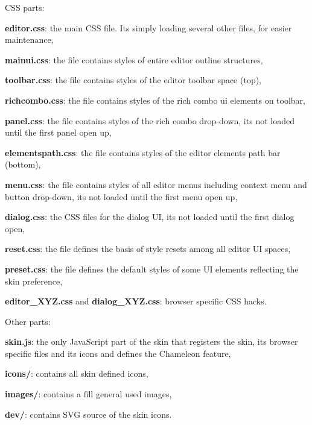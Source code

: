 C\+S\+S parts\+:
\begin{DoxyItemize}
\item {\bfseries editor.\+css}\+: the main C\+S\+S file. It\textquotesingle{}s simply loading several other files, for easier maintenance,
\item {\bfseries mainui.\+css}\+: the file contains styles of entire editor outline structures,
\item {\bfseries toolbar.\+css}\+: the file contains styles of the editor toolbar space (top),
\item {\bfseries richcombo.\+css}\+: the file contains styles of the rich combo ui elements on toolbar,
\item {\bfseries panel.\+css}\+: the file contains styles of the rich combo drop-\/down, it\textquotesingle{}s not loaded until the first panel open up,
\item {\bfseries elementspath.\+css}\+: the file contains styles of the editor elements path bar (bottom),
\item {\bfseries menu.\+css}\+: the file contains styles of all editor menus including context menu and button drop-\/down, it\textquotesingle{}s not loaded until the first menu open up,
\item {\bfseries dialog.\+css}\+: the C\+S\+S files for the dialog U\+I, it\textquotesingle{}s not loaded until the first dialog open,
\item {\bfseries reset.\+css}\+: the file defines the basis of style resets among all editor U\+I spaces,
\item {\bfseries preset.\+css}\+: the file defines the default styles of some U\+I elements reflecting the skin preference,
\item {\bfseries editor\+\_\+\+X\+Y\+Z.\+css} and {\bfseries dialog\+\_\+\+X\+Y\+Z.\+css}\+: browser specific C\+S\+S hacks.
\end{DoxyItemize}

Other parts\+:
\begin{DoxyItemize}
\item {\bfseries skin.\+js}\+: the only Java\+Script part of the skin that registers the skin, its browser specific files and its icons and defines the Chameleon feature,
\item {\bfseries icons/}\+: contains all skin defined icons,
\item {\bfseries images/}\+: contains a fill general used images,
\item {\bfseries dev/}\+: contains S\+V\+G source of the skin icons.
\end{DoxyItemize}

